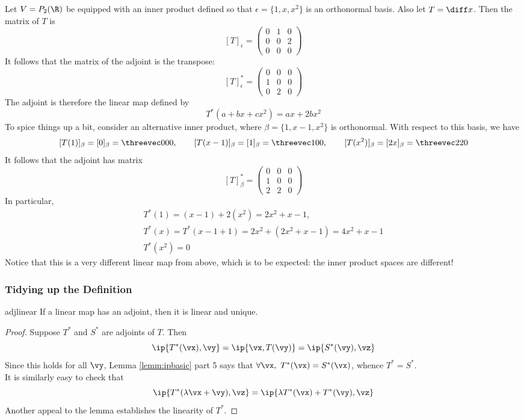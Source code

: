 \begin{example}[breakable]{}{}
Let $V=P_2(\R)$ be equipped with an inner product defined so that $\epsilon=\{1,x,x^2\}$ is an orthonormal basis. Also let $T=\diff x$. Then the matrix of $T$ is
\[[T]_\epsilon=\begin{pmatrix}
0&1&0\\
0&0&2\\
0&0&0
\end{pmatrix}\]
It follows that the matrix of the adjoint is the transpose:
\[[T]_\epsilon^*=\begin{pmatrix}
0&0&0\\
1&0&0\\
0&2&0
\end{pmatrix}\]
The adjoint is therefore the linear map defined by
\[T^*(a+bx+cx^2)=ax+2bx^2\]
To spice things up a bit, consider an alternative inner product, where $\beta=\{1,x-1,x^2\}$ is orthonormal. With respect to this basis, we have
\[[T(1)]_\beta=[0]_\beta=\threevec 000,\qquad [T(x-1)]_\beta=[1]_\beta=\threevec 100,\qquad [T(x^2)]_\beta=[2x]_\beta=\threevec 220\]
It follows that the adjoint has matrix
\[[T]_\beta^*=\begin{pmatrix}
0&0&0\\
1&0&0\\
2&2&0
\end{pmatrix}\]
In particular,
\begin{gather*}
T^*(1)=(x-1)+2(x^2)=2x^2+x-1,\\
T^*(x)=T^*(x-1+1)=2x^2+(2x^2+x-1)=4x^2+x-1\\
T^*(x^2)=0
\end{gather*}
Notice that this is a very different linear map from above, which is to be expected: the inner product spaces are different!
\end{example}

\subsubsection*{Tidying up the Definition}



\begin{lemm}{}{adjlinear}
If a linear map has an adjoint, then it is linear and unique.
\end{lemm}

\begin{proof}
Suppose $T^*$ and $S^*$ are adjoints of $T$. Then
\[\ip{T^*(\vx),\vy}=\ip{\vx,T(\vy)}=\ip{S^*(\vy),\vz}\]
Since this holds for all $\vy$, Lemma \ref{lemm:ipbasic} part 5 says that $\forall\vx,\ T^*(\vx)=S^*(\vx)$, whence $T^*=S^*$.\\
It is similarly easy to check that
\[\ip{T^*(\lambda\vx+\vy),\vz} =\ip{\lambda T^*(\vx)+T^*(\vy),\vz}\]
Another appeal to the lemma establishes the linearity of $T^*$.
\end{proof}


